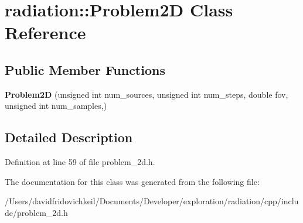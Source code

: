 \hypertarget{classradiation_1_1_problem2_d}{}\section{radiation\+:\+:Problem2D Class Reference}
\label{classradiation_1_1_problem2_d}
\subsection*{Public Member Functions}
\begin{DoxyCompactItemize}
\item 
\hypertarget{classradiation_1_1_problem2_d_a36dd80d0a55f36b57e0561e1ecbae10b}{}\label{classradiation_1_1_problem2_d_a36dd80d0a55f36b57e0561e1ecbae10b} 
{\bfseries Problem2D} (unsigned int num\+\_\+sources, unsigned int num\+\_\+steps, double fov, unsigned int num\+\_\+samples,)
\end{DoxyCompactItemize}


\subsection{Detailed Description}


Definition at line 59 of file problem\+\_\+2d.\+h.



The documentation for this class was generated from the following file\+:\begin{DoxyCompactItemize}
\item 
/\+Users/davidfridovichkeil/\+Documents/\+Developer/exploration/radiation/cpp/include/problem\+\_\+2d.\+h\end{DoxyCompactItemize}
